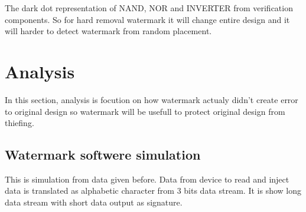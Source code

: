 \documentclass[10pt,journal,compsoc,letterpaper,final]{IEEEtran}
\begin{document}
The dark dot representation of NAND, NOR and INVERTER from verification components. So for hard removal watermark it will change entire design and it will harder to detect watermark from random placement.

\section{Analysis}
In this section, analysis is focution on how watermark actualy didn't create error to original design
so watermark will be usefull to protect original design from thiefing.

\subsection{Watermark softwere simulation}
This is simulation from data given before. Data from device to read and inject data is translated as alphabetic character from 3 bits data stream. It is show long data stream with short data output as signature.
\end{document}

